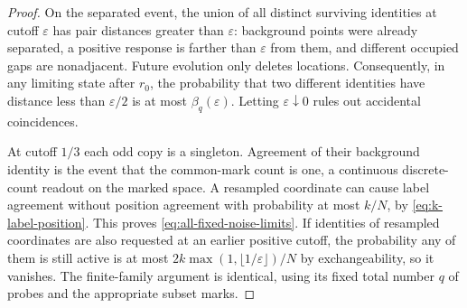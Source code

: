 \documentclass[11pt,letterpaper]{article}
\begin{document}
\begin{proof}
On the separated event, the union of all distinct surviving identities
at cutoff $\varepsilon$ has pair distances greater than $\varepsilon$:
background points were already separated, a positive response is
farther than $\varepsilon$ from them, and different occupied gaps are
nonadjacent. Future evolution only deletes locations. Consequently,
in any limiting state after $r_0$, the probability that two different
identities have distance less than $\varepsilon/2$ is at most
$\beta_q(\varepsilon)$. Letting $\varepsilon\downarrow0$ rules out
accidental coincidences.

At cutoff $1/3$ each odd copy is a singleton. Agreement of their
background identity is the event that the common-mark count is one,
a continuous discrete-count readout on the marked space. A resampled
coordinate can cause label agreement without position agreement with
probability at most $k/N$, by \eqref{eq:k-label-position}. This proves
\eqref{eq:all-fixed-noise-limits}. If identities of resampled coordinates
are also requested at an earlier positive cutoff, the probability any
of them is still active is at most
$2k\max(1,\lfloor1/\varepsilon\rfloor)/N$ by exchangeability, so it
vanishes. The finite-family argument is identical, using its fixed
total number $q$ of probes and the appropriate subset marks.
\end{proof}
\end{document}

